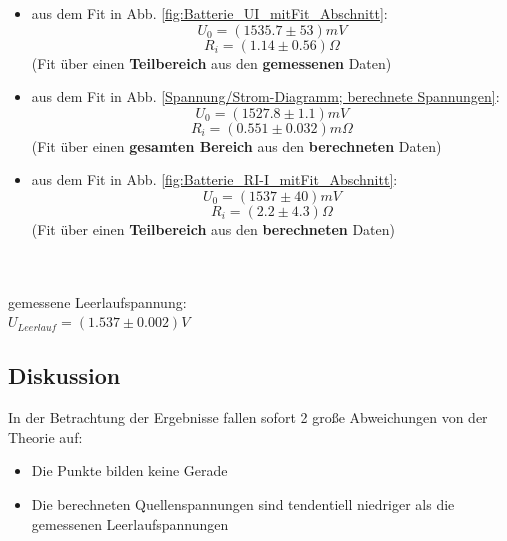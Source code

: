\documentclass[12pt,a4paper]{article}
\begin{document}
\begin{multicols}{2}


\begin{itemize}

	\item
	\noindent aus dem Fit in Abb. \ref{fig:Batterie_UI_mitFit_Abschnitt}:
	$$U_0=(1535.7 \pm 53)mV$$
	$$R_i=(1.14 \pm 0.56)\Omega$$
	(Fit über einen \textbf{Teilbereich} aus den \textbf{gemessenen} Daten)\\
	
	
	
	\item
	\noindent aus dem Fit in Abb. \ref{Spannung/Strom-Diagramm; berechnete Spannungen}:
	$$U_0 = (1527.8 \pm 1.1)mV$$
	$$R_i=(0.551 \pm 0.032)m \Omega$$
	(Fit über einen \textbf{gesamten Bereich} aus den \textbf{berechneten} Daten)\\
	
	
	\item
	\noindent aus dem Fit in Abb. \ref{fig:Batterie_RI-I_mitFit_Abschnitt}:
	$$U_0=(1537 \pm 40)mV$$
	$$R_i=(2.2 \pm 4.3)\Omega$$
	(Fit über einen \textbf{Teilbereich} aus den \textbf{berechneten} Daten)\\
	\\
	\\
\end{itemize}

\noindent gemessene Leerlaufspannung:\\
$U_{Leerlauf}=(1.537 \pm 0.002)V$

\subsection{Diskussion}
In der Betrachtung der Ergebnisse fallen sofort 2 große Abweichungen von der Theorie auf:\\
\begin{itemize}
	\item Die Punkte bilden keine Gerade
	\item Die berechneten Quellenspannungen sind tendentiell niedriger als die gemessenen Leerlaufspannungen
\end{itemize}


\end{multicols}
\end{document}
